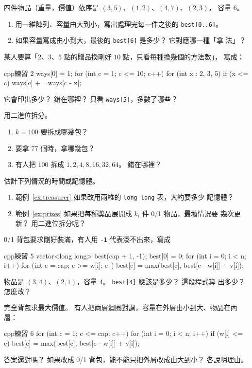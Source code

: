 \begin{drills}[label=drills:knap]
\item 四件物品（重量，價值）依序是 $(3, 5)$、$(1, 2)$、$(4, 7)$、$(2, 3)$，
容量 $6$。
\begin{enumerate}
\item 用一維陣列、容量由大到小，寫出處理完每一件之後的 \texttt{best[0..6]}。
\item 如果容量寫成由小到大，最後的 \texttt{best[6]} 是多少？ 它對應哪一種「拿
法」？
\end{enumerate}

\item 某人要算「$2$、$3$、$5$ 點的贈品換剛好 $10$ 點，只看每種換幾個的方法數」，
寫成：
\begin{code}{cpp}{練習 2}
ways[0] = 1;
for (int c = 1; c <= 10; c++) {
    for (int x : {2, 3, 5}) {
        if (x <= c) {
            ways[c] += ways[c - x];
        }
    }
}
\end{code}
它會印出多少？ 錯在哪裡？ 只看 \texttt{ways[5]}，多數了哪些？

\item 用二進位拆分。
\begin{enumerate}
\item $k = 100$ 要拆成哪幾包？
\item 要拿 $77$ 個時，拿哪幾包？
\item 有人把 $100$ 拆成 $1, 2, 4, 8, 16, 32, 64$。 錯在哪裡？
\end{enumerate}

\item 估計下列情況的時間或記憶體。
\begin{enumerate}
\item 範例~\ref{ex:treasurer} 如果改用兩維的 \texttt{long long} 表，大約要多少
記憶體？
\item 範例~\ref{ex:prizes} 如果把每種獎品展開成 $k_i$ 件 0/1 物品，最壞情況要
幾次更新？ 用二進位拆分呢？
\end{enumerate}

\item 0/1 背包要求剛好裝滿，有人用 \texttt{-1} 代表湊不出來，寫成
\begin{code}{cpp}{練習 5}
vector<long long> best(cap + 1, -1);
best[0] = 0;
for (int i = 0; i < n; i++) {
    for (int c = cap; c >= w[i]; c--) {
        best[c] = max(best[c], best[c - w[i]] + v[i]);
    }
}
\end{code}
物品是 $(3, 4)$、$(2, 1)$，容量 $4$。 \texttt{best[4]} 應該是多少？ 這段程式算
出多少？ 怎麼改？

\item 完全背包求最大價值。 有人把兩層迴圈對調，容量在外層由小到大、物品在內層：
\begin{code}{cpp}{練習 6}
for (int c = 1; c <= cap; c++) {
    for (int i = 0; i < n; i++) {
        if (w[i] <= c) {
            best[c] = max(best[c], best[c - w[i]] + v[i]);
        }
    }
}
\end{code}
答案還對嗎？ 如果改成 0/1 背包，能不能只把外層改成由大到小？ 各說明理由。
\end{drills}

